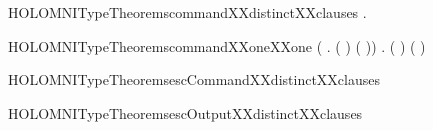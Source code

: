 \begin{SaveVerbatim}{HOLOMNITypeTheoremscommandXXdistinctXXclauses}
\HOLTokenTurnstile{} \HOLSymConst{\HOLTokenForall{}} .   \HOLSymConst{\HOLTokenNotEqual{}}  
\end{SaveVerbatim}
\newcommand{\HOLOMNITypeTheoremscommandXXdistinctXXclauses}{\UseVerbatim{HOLOMNITypeTheoremscommandXXdistinctXXclauses}}
\begin{SaveVerbatim}{HOLOMNITypeTheoremscommandXXoneXXone}
\HOLTokenTurnstile{} (\HOLSymConst{\HOLTokenForall{}} . (  \HOLSymConst{=}  ) \HOLSymConst{\HOLTokenEquiv{}} ( \HOLSymConst{=} )) \HOLSymConst{\HOLTokenConj{}}
   \HOLSymConst{\HOLTokenForall{}} . (  \HOLSymConst{=}  ) \HOLSymConst{\HOLTokenEquiv{}} ( \HOLSymConst{=} )
\end{SaveVerbatim}
\newcommand{\HOLOMNITypeTheoremscommandXXoneXXone}{\UseVerbatim{HOLOMNITypeTheoremscommandXXoneXXone}}
\begin{SaveVerbatim}{HOLOMNITypeTheoremsescCommandXXdistinctXXclauses}
\HOLTokenTurnstile{}  \HOLSymConst{\HOLTokenNotEqual{}}  \HOLSymConst{\HOLTokenConj{}}  \HOLSymConst{\HOLTokenNotEqual{}}  \HOLSymConst{\HOLTokenConj{}}
    \HOLSymConst{\HOLTokenNotEqual{}}  \HOLSymConst{\HOLTokenConj{}}  \HOLSymConst{\HOLTokenNotEqual{}}  \HOLSymConst{\HOLTokenConj{}}
    \HOLSymConst{\HOLTokenNotEqual{}}  \HOLSymConst{\HOLTokenConj{}}  \HOLSymConst{\HOLTokenNotEqual{}} 
\end{SaveVerbatim}
\newcommand{\HOLOMNITypeTheoremsescCommandXXdistinctXXclauses}{\UseVerbatim{HOLOMNITypeTheoremsescCommandXXdistinctXXclauses}}
\begin{SaveVerbatim}{HOLOMNITypeTheoremsescOutputXXdistinctXXclauses}
\HOLTokenTurnstile{}  \HOLSymConst{\HOLTokenNotEqual{}}  \HOLSymConst{\HOLTokenConj{}}  \HOLSymConst{\HOLTokenNotEqual{}}  \HOLSymConst{\HOLTokenConj{}}
    \HOLSymConst{\HOLTokenNotEqual{}}  \HOLSymConst{\HOLTokenConj{}}  \HOLSymConst{\HOLTokenNotEqual{}}  \HOLSymConst{\HOLTokenConj{}}
    \HOLSymConst{\HOLTokenNotEqual{}}  \HOLSymConst{\HOLTokenConj{}}  \HOLSymConst{\HOLTokenNotEqual{}} 
\end{SaveVerbatim}
